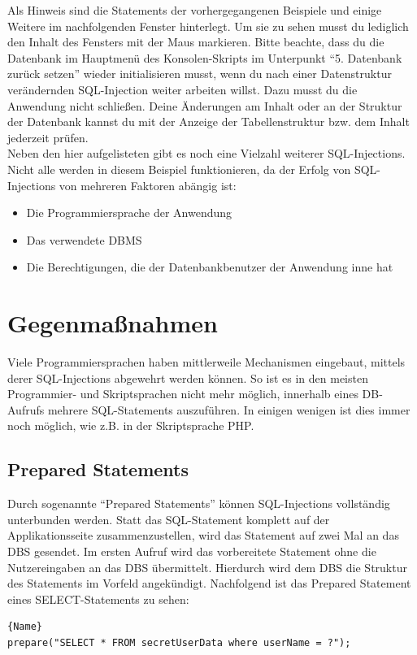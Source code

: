 Als Hinweis sind die Statements der vorhergegangenen Beispiele und einige Weitere im nachfolgenden Fenster hinterlegt. Um sie zu sehen musst du lediglich den Inhalt des Fensters mit der Maus markieren. Bitte beachte, dass du die Datenbank im Hauptmenü des Konsolen-Skripts im Unterpunkt \enquote{5. Datenbank zurück setzen} wieder initialisieren musst, wenn du nach einer Datenstruktur verändernden SQL-Injection weiter arbeiten willst. Dazu musst du die Anwendung nicht schließen. Deine Änderungen am Inhalt oder an der Struktur der Datenbank kannst du mit der Anzeige der Tabellenstruktur bzw. dem Inhalt jederzeit prüfen.\\

Neben den hier aufgelisteten gibt es noch eine Vielzahl weiterer SQL-Injections. Nicht alle werden in diesem Beispiel funktionieren, da der Erfolg von SQL-Injections von mehreren Faktoren abängig ist:
\begin{itemize}
	\item Die Programmiersprache der Anwendung
	\item Das verwendete DBMS
	\item Die Berechtigungen, die der Datenbankbenutzer der Anwendung inne hat
\end{itemize}

\section{Gegenmaßnahmen}
Viele Programmiersprachen haben mittlerweile Mechanismen eingebaut, mittels derer SQL-Injections abgewehrt werden können. So ist es in den meisten Programmier- und Skriptsprachen nicht mehr möglich, innerhalb eines DB-Aufrufs mehrere SQL-Statements auszuführen. In einigen wenigen ist dies immer noch möglich, wie z.B. in der Skriptsprache PHP.
\subsection{Prepared Statements}
Durch sogenannte \enquote{Prepared Statements} können SQL-Injections vollständig unterbunden werden. Statt das SQL-Statement komplett auf der Applikationsseite zusammenzustellen, wird das Statement auf zwei Mal an das DBS gesendet. Im ersten Aufruf wird das vorbereitete Statement ohne die Nutzereingaben an das DBS übermittelt. Hierdurch wird dem DBS die Struktur des Statements im Vorfeld angekündigt. Nachfolgend ist das Prepared Statement eines SELECT-Statements zu sehen:
\begin{lstlisting}[caption=Prepared Statement]{Name}
prepare("SELECT * FROM secretUserData where userName = ?");
\end{lstlisting}

